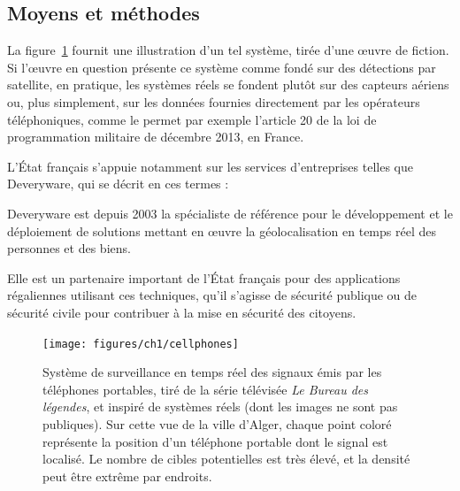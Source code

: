 	\FloatBarrier \subsection{Moyens et méthodes}
	La figure~\ref{fig:cellphones} fournit une illustration d'un tel système, tirée d'une œuvre de fiction. Si l'œuvre en question présente ce système comme fondé sur des détections par satellite, en pratique, les systèmes réels se fondent plutôt sur des capteurs aériens ou, plus simplement, sur les données fournies directement par les opérateurs téléphoniques, comme le permet par exemple l'article 20 de la loi de programmation militaire de décembre 2013, en France\footnotemark.
	
	
	L'État français s'appuie notamment sur les services d'entreprises telles que Deveryware, qui se décrit en ces termes :
	
	\begin{displayquote}
		Deveryware est depuis 2003 la spécialiste de référence pour le développement et le déploiement de solutions mettant en œuvre la géolocalisation en temps réel des personnes et des biens.

		Elle est un partenaire important de l'État français pour des applications régaliennes utilisant ces techniques, qu'il s'agisse de sécurité publique ou de sécurité civile pour contribuer à la mise en sécurité des citoyens.\footnotemark{}
	\end{displayquote}
	
	
	\begin{figure}[!htbp]
		\centering
		\texttt{[image: figures/ch1/cellphones]}
		\caption[Surveillance des signaux de téléphones portables]{Système de surveillance en temps réel des signaux émis par les téléphones portables, tiré de la série télévisée \emph{Le Bureau des légendes}\footnotemark{}, et inspiré de systèmes réels (dont les images ne sont pas publiques). Sur cette vue de la ville d'Alger, chaque point coloré représente la position d'un téléphone portable dont le signal est localisé. Le nombre de cibles potentielles est très élevé, et la densité peut être extrême par endroits.}
		\label{fig:cellphones}
	\end{figure}
	
	
